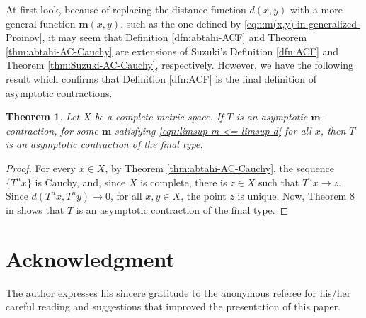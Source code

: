 \documentclass[a4paper,10pt,twoside,reqno]{amsart}
\newtheorem{thm}{Theorem}[section]
\theoremstyle{definition}
\theoremstyle{remark}
\newcommand{\set}[1]{\{#1\}}
\newcommand{\m}{\mathbf{m}}
\numberwithin{equation}{section}
\begin{document}
At first look, because of replacing the distance function $d(x,y)$ with
a more general function $\m(x,y)$, such as the one defined by \eqref{eqn:m(x,y)-in-generalized-Proinov},
it may seem that Definition \ref{dfn:abtahi-ACF} and
Theorem \ref{thm:abtahi-AC-Cauchy} are extensions of Suzuki's Definition \ref{dfn:ACF} and
Theorem \ref{thm:Suzuki-AC-Cauchy}, respectively. However, we have the following result which
confirms that Definition \ref{dfn:ACF} is the final definition of asymptotic contractions.

\begin{thm}
\label{thm:final}
  Let $X$ be a complete metric space. If $T$ is an asymptotic $\m$-contraction,
  for some $\m$ satisfying \eqref{eqn:limsup m <= limsup d} for all $x$, then $T$ is
  an asymptotic contraction of the final type.
\end{thm}

\begin{proof}
  For every $x\in X$, by Theorem \ref{thm:abtahi-AC-Cauchy}, the sequence $\set{T^nx}$ is Cauchy,
  and, since $X$ is complete, there is $z\in X$ such that $T^nx\to z$.  Since $d(T^nx,T^ny)\to0$,
  for all $x,y\in X$, the point $z$ is unique. Now, Theorem 8 in \cite{Suzuki-AC-2007} shows
  that $T$ is an asymptotic contraction of the final type.
\end{proof}

\bigskip

\section*{Acknowledgment}

The author expresses his sincere gratitude to the anonymous referee for his/her careful reading
and suggestions that improved the presentation of this paper.
\end{document}
